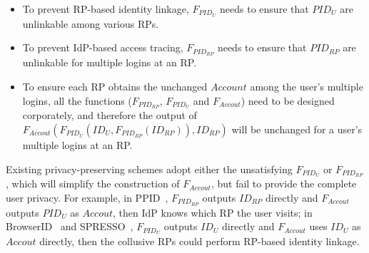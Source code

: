 \begin{itemize}
  \item To prevent RP-based identity linkage, $F_{PID_{U}}$ needs to ensure that $PID_{U}$ are  unlinkable among various RPs.
  \item To prevent IdP-based access tracing, $F_{PID_{RP}}$ needs to ensure that $PID_{RP}$ are  unlinkable for multiple logins at an RP.
  \item To ensure each RP obtains the unchanged $Account$ among the user's multiple logins,
  all the functions ($F_{PID_{RP}}$, $F_{PID_{U}}$ and $F_{Accout}$) need to be designed corporately,
   and therefore the output of $F_{Accout}(F_{PID_{U}}(ID_U, F_{PID_{RP}}(ID_{RP})), ID_{RP})$ will be unchanged for a user's multiple logins at an RP.
\end{itemize}

Existing privacy-preserving schemes adopt either the unsatisfying $F_{PID_{U}}$ or $F_{PID_{RP}}$,
 which will simplify the construction of $F_{Accout}$, but fail to provide the complete user privacy.
For example,
in PPID~\cite{OpenIDConnect, SAMLIdentifier},
$F_{PID_{RP}}$ outputs $ID_{RP}$ directly and $F_{Accout}$ outputs  $PID_{U}$ as $Accout$, then IdP knows which RP the user visits;
in BrowserID~\cite{BrowserID} and SPRESSO~\cite{SPRESSO},
$F_{PID_{U}}$ outputs $ID_U$ directly and $F_{Accout}$ uses $ID_U$ as $Accout$ directly, then the collusive RPs could perform  RP-based identity linkage.



